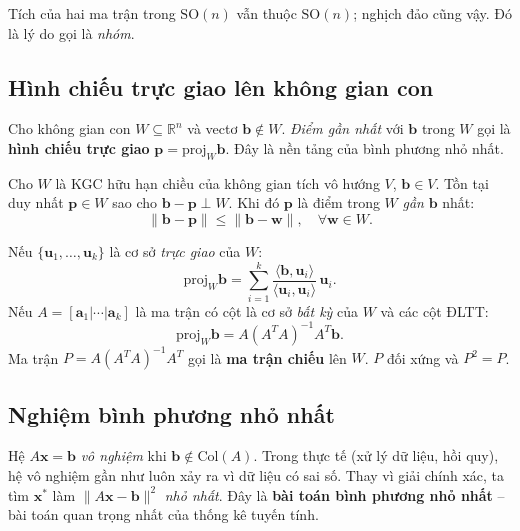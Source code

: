 \documentclass[12pt,a4paper]{article}
\begin{document}
\begin{luuy}
Tích của hai ma trận trong $\mathrm{SO}(n)$ vẫn thuộc $\mathrm{SO}(n)$; nghịch đảo cũng vậy. Đó là lý do gọi là \emph{nhóm}.
\end{luuy}

\subsection{Hình chiếu trực giao lên không gian con}

\begin{dongco}
Cho không gian con $W \subseteq \mathbb{R}^n$ và vectơ $\mathbf{b} \notin W$. \emph{Điểm gần nhất} với $\mathbf{b}$ trong $W$ gọi là \textbf{hình chiếu trực giao} $\mathbf{p} = \mathrm{proj}_W \mathbf{b}$. Đây là nền tảng của bình phương nhỏ nhất.
\end{dongco}

\begin{dinhly}[title={Tính duy nhất của hình chiếu}]
Cho $W$ là KGC hữu hạn chiều của không gian tích vô hướng $V$, $\mathbf{b} \in V$. Tồn tại duy nhất $\mathbf{p} \in W$ sao cho $\mathbf{b} - \mathbf{p} \perp W$. Khi đó $\mathbf{p}$ là điểm trong $W$ \emph{gần} $\mathbf{b}$ nhất:
\[
  \|\mathbf{b} - \mathbf{p}\| \le \|\mathbf{b} - \mathbf{w}\|,\quad \forall \mathbf{w} \in W.
\]
\end{dinhly}

\begin{congthuc}[title={Công thức hình chiếu}]
Nếu $\{\mathbf{u}_1, \ldots, \mathbf{u}_k\}$ là cơ sở \emph{trực giao} của $W$:
\[
  \mathrm{proj}_W \mathbf{b} = \sum_{i=1}^k \dfrac{\langle \mathbf{b}, \mathbf{u}_i\rangle}{\langle \mathbf{u}_i, \mathbf{u}_i\rangle}\, \mathbf{u}_i.
\]
Nếu $A = [\mathbf{a}_1 | \cdots | \mathbf{a}_k]$ là ma trận có cột là cơ sở \emph{bất kỳ} của $W$ và các cột ĐLTT:
\[
  \mathrm{proj}_W \mathbf{b} = A(A^T A)^{-1} A^T \mathbf{b}.
\]
Ma trận $P = A(A^T A)^{-1} A^T$ gọi là \textbf{ma trận chiếu} lên $W$. $P$ đối xứng và $P^2 = P$.
\end{congthuc}

\subsection{Nghiệm bình phương nhỏ nhất}

\begin{dongco}
Hệ $A\mathbf{x} = \mathbf{b}$ \emph{vô nghiệm} khi $\mathbf{b} \notin \mathrm{Col}(A)$. Trong thực tế (xử lý dữ liệu, hồi quy), hệ vô nghiệm gần như luôn xảy ra vì dữ liệu có sai số. Thay vì giải chính xác, ta tìm $\mathbf{x}^*$ làm $\|A\mathbf{x} - \mathbf{b}\|^2$ \emph{nhỏ nhất}. Đây là \textbf{bài toán bình phương nhỏ nhất} -- bài toán quan trọng nhất của thống kê tuyến tính.
\end{dongco}
\end{document}
